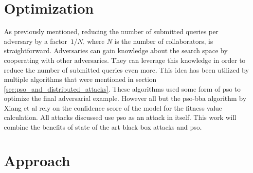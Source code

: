\section{Optimization} \label{sec:optimization_approach}
As previously mentioned, reducing the number of submitted queries per adversary by a factor~$1/N$, where $N$ is the number of collaborators, is straightforward. Adversaries can gain knowledge about the search space by cooperating with other adversaries. They can leverage this knowledge in order to reduce the number of submitted queries even more. This idea has been utilized by multiple algorithms that were mentioned in section \ref{sec:pso_and_distributed_attacks}. These algorithms used some form of \gls{pso} to optimize the final adversarial example. However all but the \gls{pso}-\gls{bba} algorithm by Xiang et al \cite{distributed_pso_attack} rely on the confidence score of the model for the fitness value calculation. All attacks discussed use \gls{pso} as an attack in itself. This work will combine the benefits of state of the art black box attacks and \gls{pso}.

\section{Approach}